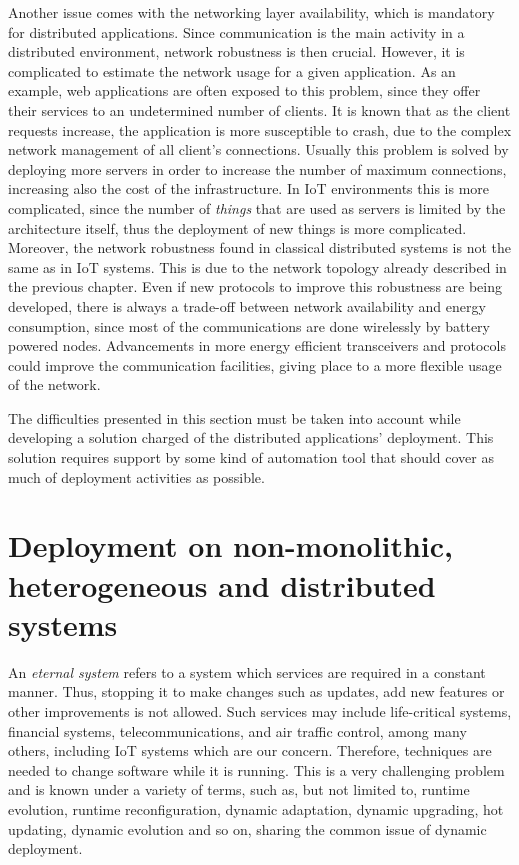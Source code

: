 Another issue comes with the networking layer availability, which is mandatory for distributed applications.
Since communication is the main activity in a distributed environment, network robustness is then crucial.
However, it is complicated to estimate the network usage for a given application.
As an example, web applications are often exposed to this problem, since they offer their services to an undetermined number of clients.
It is known that as the client requests increase, the application is more susceptible to crash, due to the complex network management of all client's connections.
Usually this problem is solved by deploying more servers in order to increase the number of maximum connections, increasing also the cost of the infrastructure.
In IoT environments this is more complicated, since the number of \textit{things} that are used as servers is limited by the architecture itself, thus the deployment of new things is more complicated.
Moreover, the network robustness found in classical distributed systems is not the same as in IoT systems.
This is due to the network topology already described in the previous chapter.
Even if new protocols to improve this robustness are being developed\cite{thubert2013ietf}, there is always a trade-off between network availability and energy consumption, since most of the communications are done wirelessly by battery powered nodes.
Advancements in more energy efficient transceivers and protocols could improve the communication facilities, giving place to a more flexible usage of the network.

The difficulties presented in this section must be taken into account while developing a solution charged of the distributed applications' deployment.
This solution requires support by some kind of automation tool that should cover as much of deployment activities as possible. 

\section{Deployment on non-monolithic, heterogeneous and distributed systems}
\label{sec:dynamicDeploymentDAS}
An \textit{eternal system} refers to a system which services are required in a constant manner.
Thus, stopping it to make changes such as updates, add new features or other improvements is not allowed.
Such services may include life-critical systems, financial systems, telecommunications, and air traffic control, among many others, including IoT systems which are our concern.
Therefore, techniques are needed to change software while it is running. 
This is a very challenging problem and is known under a variety of terms, such as, but not limited to, runtime evolution, runtime reconfiguration, dynamic adaptation, dynamic upgrading, hot updating, dynamic evolution and so on, sharing the common issue of dynamic deployment.

